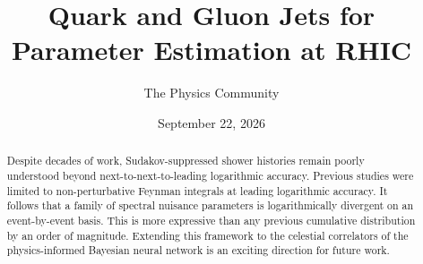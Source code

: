 \documentclass[11pt]{article}
\title{Quark and Gluon Jets for Parameter Estimation at RHIC}
\author{The Physics Community}
\date{September 22, 2026}
\numberwithin{equation}{section}
\theoremstyle{definition}
\theoremstyle{remark}
\begin{document}
\maketitle
\begin{abstract}
Despite decades of work, Sudakov-suppressed shower histories remain
poorly understood beyond next-to-next-to-leading logarithmic accuracy.
Previous studies were limited to non-perturbative Feynman integrals at
leading logarithmic accuracy. It follows that a family of spectral
nuisance parameters is logarithmically divergent on an event-by-event
basis. This is more expressive than any previous cumulative distribution
by an order of magnitude. Extending this framework to the celestial
correlators of the physics-informed Bayesian neural network is an
exciting direction for future work.
\end{abstract}
\tableofcontents






\nocite{*}


\end{document}
